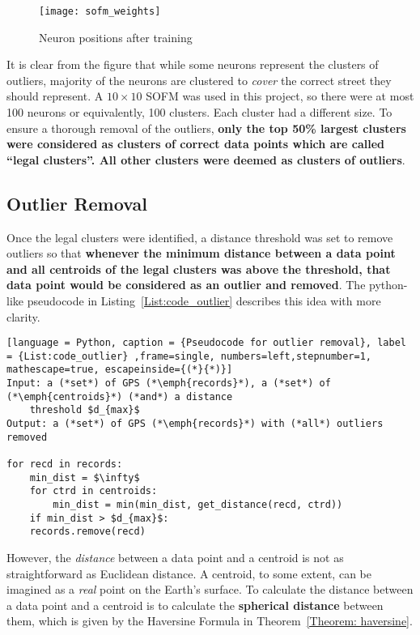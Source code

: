\begin{figure}[h]
\texttt{[image: sofm\_weights]}
\centering
\caption{Neuron positions after training}\label{Fig:sofm_weights}
\end{figure}

It is clear from the figure that while some neurons represent the clusters of outliers, majority of the neurons are clustered to \emph{cover} the correct street they should represent. A $10\times10$ SOFM was used in this project, so there were at most 100 neurons or equivalently, 100 clusters. Each cluster had a different size. To ensure a thorough removal of the outliers, \textbf{only the top 50\% largest clusters were considered as clusters of correct data points which are called ``legal clusters''. All other clusters were deemed as clusters of outliers}. 

\subsection{Outlier Removal}\label{Subsec:outlier_removal}
Once the legal clusters were identified, a distance threshold was set to remove outliers so that \textbf{whenever the minimum distance between a data point and all centroids of the legal clusters was above the threshold, that data point would be considered as an outlier and removed}. The python-like pseudocode in Listing~\ref{List:code_outlier} describes this idea with more clarity.

\begin{lstlisting}[language = Python, caption = {Pseudocode for outlier removal}, label = {List:code_outlier} ,frame=single, numbers=left,stepnumber=1, mathescape=true, escapeinside={(*}{*)}]
Input: a (*set*) of GPS (*\emph{records}*), a (*set*) of (*\emph{centroids}*) (*and*) a distance 
    threshold $d_{max}$
Output: a (*set*) of GPS (*\emph{records}*) with (*all*) outliers removed

for recd in records:
    min_dist = $\infty$
    for ctrd in centroids:
        min_dist = min(min_dist, get_distance(recd, ctrd))
    if min_dist > $d_{max}$:
	records.remove(recd)
\end{lstlisting}

However, the \emph{distance} between a data point and a centroid is not as straightforward as Euclidean distance. A centroid, to some extent, can be imagined as a \emph{real} point on the Earth's surface. To calculate the distance between a data point and a centroid is to calculate the \textbf{spherical distance} between them, which is given by the Haversine Formula in Theorem~\ref{Theorem: haversine}. 

